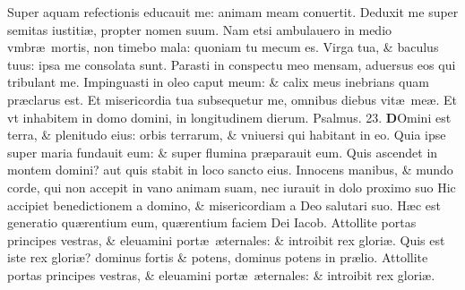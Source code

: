 \documentclass[a5paper,10pt]{book}
\def\ae{æ}
\begin{document}
\begin{multicols*}{2}
\newline \color{red} S\color{black}uper aquam refectionis educauit me: animam meam conuertit.
\newline \color{red} D\color{black}eduxit me super semitas iustiti\ae , propter nomen suum.
\newline \color{red} N\color{black}am etsi ambulauero in medio vmbr\ae \ mortis, non timebo mala: quoniam tu mecum es.%
\newline \color{red} V\color{black}irga tua, \& baculus tuus: ipsa me consolata sunt.
\newline \color{red} P\color{black}arasti in conspectu meo mensam, aduersus eos qui tribulant me.
\newline \color{red} I\color{black}mpinguasti in oleo caput meum: \& calix meus inebrians quam pr\ae clarus est.
\newline \color{red} E\color{black}t misericordia tua subsequetur me, omnibus diebus vit\ae \ me\ae .
\newline \color{red} E\color{black}t vt inhabitem in domo domini, in longitudinem dierum. \quad \color{red} Psalmus. \hypertarget{ps23}{23.} \color{black}
\vspace{-.5em}
\lettrine[lines=2]{\bfseries \color{red} D}{}Omini est terra, \& plenitudo eius: orbis terrarum, \& vniuersi qui habitant in eo.
\newline \color{red} Q\color{black}uia ipse super maria fundauit eum: \& super flumina pr\ae parauit eum.
\newline \color{red} Q\color{black}uis ascendet in montem domini? aut quis stabit in loco sancto eius.
\newline \color{red} I\color{black}nnocens manibus, \& mundo corde, qui non accepit in vano animam suam, nec iurauit in dolo proximo suo %
\newline \color{red} H\color{black}ic accipiet benedictionem a domino, \& misericordiam a Deo salutari suo.
\newline \color{red} H\color{black}\ae c est generatio qu\ae rentium eum, qu\ae rentium faciem Dei Iacob.
\newline \color{red} A\color{black}ttollite portas principes vestras, \& eleuamini port\ae \ \ae ternales: \& introibit rex glori\ae .
\newline \color{red} Q\color{black}uis est iste rex glori\ae ? dominus fortis \& potens, dominus potens in pr\ae lio.
\newline \color{red} A\color{black}ttollite portas principes vestras, \& eleuamini port\ae \ \ae ternales: \& introibit rex glori\ae .

\end{multicols*}
\end{document}
